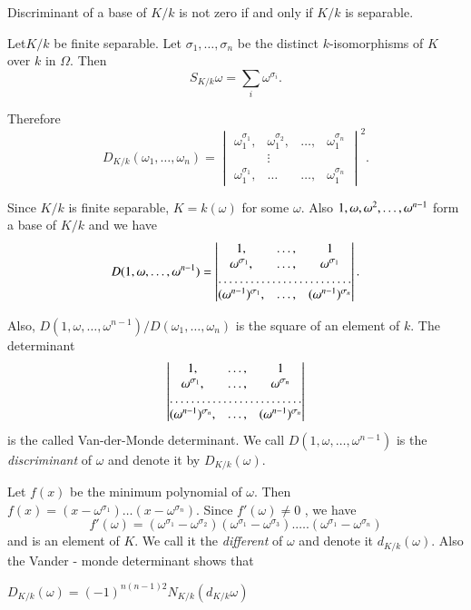 \begin{thm}\label{c4:thm5}%
Discriminant of a base of $K/k$ is not zero if and only if $K/k$ is
separable. 
\end{thm}

Let\pageoriginale $K/k$ be finite separable. Let $\sigma_1 , \ldots ,
\sigma _n$ be the distinct $k$-isomor\-phisms of $K$ over $k$ in
$\Omega$. Then   
$$
S_{K/k} \omega = \sum_i \omega^{\sigma_i}.
$$

Therefore 
\begin{equation*}
D_{ K /k} (\omega _1 , \ldots , \omega _n) = 
\begin{vmatrix} 
\omega_1 ^{\sigma _1}, & \omega_1 ^{\sigma _2}, & \ldots, & \omega_1
^{\sigma  _n} \\ 
& \vdots\\
\omega_1 ^{\sigma _1},&   \ldots &  \ldots, & \omega_1 ^{\sigma _n}  
\end{vmatrix}^2. \tag{9}\label{c4:eq9}  
\end{equation*}

Since $K/k$ is finite separable, $ K = k (\omega)$ for some
$\omega$. Also $1, \omega, \omega^2,\break \ldots , \omega^{ n -1}$ form a
base of $K/k$ and we have  
$$
D(1, \omega , \ldots , \omega^{ n - 1}) = 
\begin{vmatrix}
1, & \ldots , & 1 \\
\omega^{ \sigma_1}, & \ldots , & \omega^{ \sigma _1} \\
\hdotsfor{3} \\
(\omega^{ n - 1} )^{ \sigma_1}, &  \ldots, &  (\omega ^{ n -
  1})^ {\sigma_n} 
\end{vmatrix}.
$$

Also, $D( 1, \omega , \ldots , \omega^{ n -1 })\big / D(\omega_1,
\ldots , \omega_n)$ is the square of an element of $k$. The
determinant  
$$
\begin{vmatrix}
1, &\ldots , & 1\\
\omega^{\sigma_1} ,& \ldots, &\omega^{\sigma_n}\\
\hdotsfor{3}\\
(\omega^{n-1})^{\sigma_n} ,& \ldots ,  &(\omega^{ n-1})^{\sigma_n}
\end{vmatrix}
$$
is the called Van-der-Monde determinant. We call $D(1, \omega ,
\ldots , \omega^{ n -1})$ is the \textit{discriminant} of $\omega$
and denote it by $D_{ K/k} (\omega)$.  

Let $f(x)$ be the minimum polynomial of $\omega$. Then $f(x) = (x -
\omega^{\sigma_1}) \ldots (x - \omega^{\sigma_n})$. Since
$f'(\omega) \neq 0$ , we have  
$$
f' (\omega) = (\omega^{\sigma_1} - \omega^{\sigma_2}) (\omega^{\sigma_1}
- \omega^{\sigma_3} ). \ldots . (\omega^{\sigma_1} - \omega^{\sigma_n} ) 
$$
and is an element of $K$. We call it the \textit{different} of
$\omega$ and denote it $d_{K/k}(\omega)$. Also the Vander - monde
determinant shows that 
\begin{center}
\begin{fbox}
{$D_{K/k} (\omega)= (-1)^{n(n - 1)2} N_{K/k}
    (d_{K/k}\omega)$} 
\end{fbox}
\end{center}

